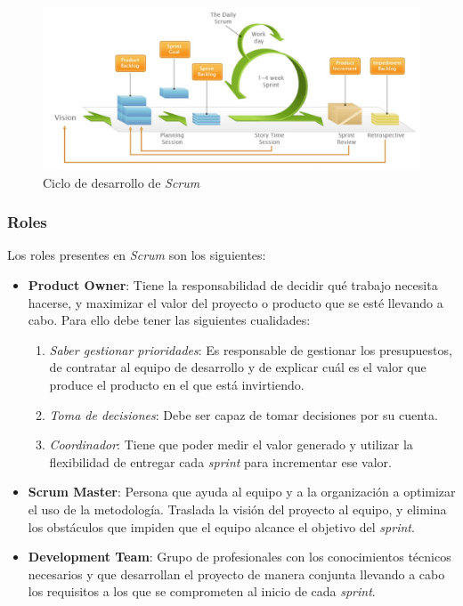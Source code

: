 \begin{figure}[H]
    \centering
    \includegraphics[width=14cm]{Images/Ciclo_Scrum.jpg}
    \caption{Ciclo de desarrollo de \textit{Scrum}}
\end{figure}

\subsubsection{Roles}
Los roles presentes en \textit{Scrum} son los siguientes:
\begin{itemize}
    \item \textbf{Product Owner}: Tiene la responsabilidad de decidir qué trabajo necesita hacerse, y maximizar el valor 
    del proyecto o producto que se esté llevando a cabo. Para ello debe tener las siguientes cualidades:
    \begin{enumerate}
        \item \textit{Saber gestionar prioridades}: Es responsable de gestionar los presupuestos, de contratar al equipo de 
        desarrollo y de explicar cuál es el valor que produce el producto en el que está invirtiendo.
        \item \textit{Toma de decisiones}: Debe ser capaz de tomar decisiones por su cuenta.
        \item \textit{Coordinador}: Tiene que poder medir el valor generado y utilizar la flexibilidad de entregar cada 
        \textit{sprint} para incrementar ese valor.
    \end{enumerate}
    
    \item \textbf{Scrum Master}: Persona que ayuda al equipo y a la organización a optimizar el uso de la 
    metodología. Traslada la visión del proyecto al equipo, y elimina los obstáculos que impiden que el equipo alcance el 
    objetivo del \textit{sprint}.

    \item \textbf{Development Team}: Grupo de profesionales con los conocimientos técnicos necesarios y que desarrollan el proyecto de manera
    conjunta llevando a cabo los requisitos a los que se comprometen al inicio de cada \textit{sprint}.
\end{itemize}

